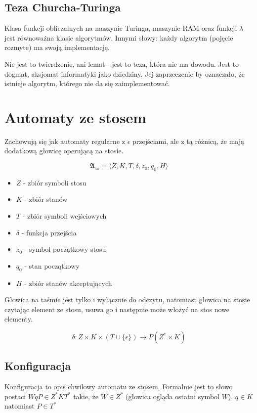 \documentclass{../notatki}
\begin{document}
\subsection{Teza Churcha-Turinga}

Klasa funkcji obliczalnych na maszynie Turinga, maszynie RAM oraz
funkcji $\lambda$ jest równoważna klasie algorytmów. Innymi słowy: każdy
algorytm (pojęcie rozmyte) ma swoją implementację.

Nie jest to twierdzenie, ani lemat - jest to teza, która nie ma dowodu. Jest to
dogmat, aksjomat informatyki jako dziedziny. Jej zaprzeczenie by oznaczało, że
istnieje algorytm, którego nie da się zaimplementować.

\section{Automaty ze stosem}

Zachowują się jak automaty regularne z $\epsilon$ przejściami, ale z tą różnicą,
że mają dodatkową głowicę operującą na stosie.

$$
\mathfrak{A}_{zs} = \langle Z, K, T, \delta, z_0, q_0, H \rangle
$$

\begin{itemize}
  \item $Z$ - zbiór symboli stosu
  \item $K$ - zbiór stanów
  \item $T$ - zbiór symboli wejściowych
  \item $\delta$ - funkcja przejścia
  \item $z_0$ - symbol początkowy stosu
  \item $q_0$ - stan początkowy
  \item $H$ - zbiór stanów akceptujących
\end{itemize}

Głowica na taśmie jest tylko i wyłącznie do odczytu, natomiast głowica na stosie
czytając element ze stosu, usuwa go i następnie może włożyć na stos nowe
elementy.

$$
\delta: Z \times K \times (T \cup \{\epsilon\}) \rightarrow P(Z^* \times K)
$$

\subsection{Konfiguracja}

Konfiguracja to opis chwilowy automatu ze stosem. Formalnie jest to słowo
postaci $WqP \in Z^*KT^*$ takie, że $W \in Z^*$ (głowica ogląda ostatni symbol
$W$), $q \in K$ natomiast $P \in T^*$
\end{document}
